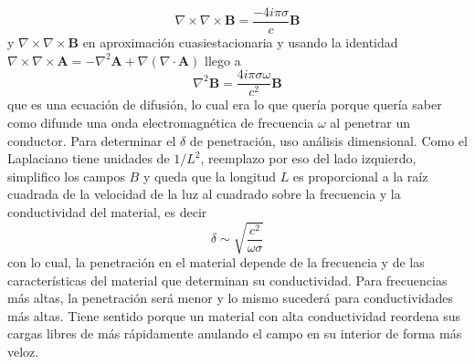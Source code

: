 \begin{equation*}
    \nabla\times\nabla\times \textbf{B} = \frac{-4i\pi\sigma}{c}\textbf{B} 
\end{equation*}
y $\nabla \times \nabla \times \textbf{B}$ en aproximación cuasiestacionaria y usando la identidad $\nabla \times \nabla \times \textbf{A} = -\nabla^{2} \textbf{A} + \nabla (\nabla \cdot \textbf{A})$ llego a
\begin{equation*}
    \nabla^{2}\textbf{B} = \frac{4 i \pi \sigma \omega}{c^{2}} \textbf{B}
\end{equation*}
que es una ecuación de difusión, lo cual era lo que quería porque quería saber como difunde una onda electromagnética de frecuencia $\omega$ al penetrar un conductor. Para determinar el $\delta$ de penetración, uso análisis dimensional. Como el Laplaciano tiene unidades de $1/L^{2}$, reemplazo por eso del lado izquierdo, simplifico los campos $B$ y queda que la longitud $L$ es proporcional a la raíz cuadrada de la velocidad de la luz al cuadrado sobre la frecuencia y la conductividad del material, es decir
\begin{equation*}
    \delta \sim \sqrt{\frac{c^{2}}{\omega \sigma}}
\end{equation*}
con lo cual, la penetración en el material depende de la frecuencia y de las características del material que determinan su conductividad. Para frecuencias más altas, la penetración será menor y lo mismo sucederá para conductividades más altas. Tiene sentido porque un material con alta conductividad reordena sus cargas libres de más rápidamente anulando el campo en su interior de forma más veloz.





